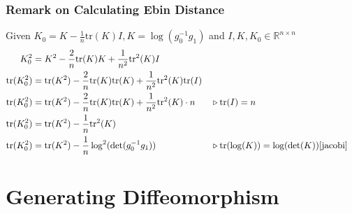 \documentclass{article}
\theoremstyle{definition}
\theoremstyle{plain}
\begin{document}
\subsubsection{Remark on Calculating Ebin Distance}
Given $K_0=K-\frac{1}{n}\mathrm{tr}(K)I, K=\log(g_0^{-1}g_1)$ and $I,K,K_0\in \mathbb{R}^{n\times n}$
\begin{align*}
    K_0^2&=K^2-\frac{2}{n}\mathrm{tr}(K)K+\frac{1}{n^2}\mathrm{tr}^2(K)I\\
    \mathrm{tr}(K^2_0)&=\mathrm{tr}(K^2)-\frac{2}{n}\mathrm{tr}(K)\mathrm{tr}(K)+\frac{1}{n^2}\mathrm{tr}^2(K)\mathrm{tr}(I)\\
    \mathrm{tr}(K^2_0)&=\mathrm{tr}(K^2)-\frac{2}{n}\mathrm{tr}(K)\mathrm{tr}(K)+\frac{1}{n^2}\mathrm{tr}^2(K)\cdot n&&\triangleright \mathrm{tr}(I)=n\\
    \mathrm{tr}(K^2_0)&=\mathrm{tr}(K^2)-\frac{1}{n}\mathrm{tr}^2(K)\\
    \mathrm{tr}(K^2_0)&=\mathrm{tr}(K^2)-\frac{1}{n}\log^2(\det(g_0^{-1}g_1))&&\triangleright \mathrm{tr}(\log(K))=\log(\det(K))\cite{jacobi}
\end{align*}

\section{Generating Diffeomorphism}
\end{document}
